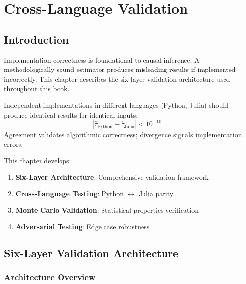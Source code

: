 \chapter{Cross-Language Validation}
\label{ch:validation}

\section{Introduction}

Implementation correctness is foundational to causal inference. A methodologically sound estimator produces misleading results if implemented incorrectly. This chapter describes the six-layer validation architecture used throughout this book.

\begin{definition}
Independent implementations in different languages (Python, Julia) should produce identical results for identical inputs:
\begin{equation}
\left| \hat{\tau}_{\text{Python}} - \hat{\tau}_{\text{Julia}} \right| < 10^{-10}
\end{equation}
Agreement validates algorithmic correctness; divergence signals implementation errors.
\end{definition}

This chapter develops:
\begin{enumerate}
\item \textbf{Six-Layer Architecture}: Comprehensive validation framework
\item \textbf{Cross-Language Testing}: Python $\leftrightarrow$ Julia parity
\item \textbf{Monte Carlo Validation}: Statistical properties verification
\item \textbf{Adversarial Testing}: Edge case robustness
\end{enumerate}


\section{Six-Layer Validation Architecture}

\subsection{Architecture Overview}

